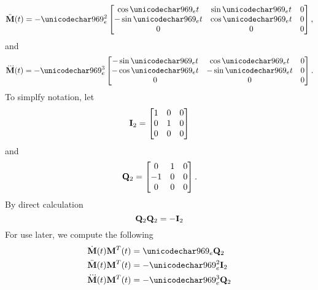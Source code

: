 \begin{equation}
 \ddot{\mtx{M}}(t) = -\omega^2_e\begin{bmatrix}
             \ct & \st & 0\\
             -\st & \ct  & 0\\
             0   & 0    & 0
            \end{bmatrix},
\end{equation}
and
\begin{equation}
 \dddot{\mtx{M}}(t) = -\omega^3_e\begin{bmatrix}
             -\st & \ct & 0\\
             -\ct & -\st  & 0\\
             0   & 0    & 0
            \end{bmatrix}.
\end{equation}
To simplfy notation, let
\begin{equation}
 \Itwo=\begin{bmatrix}
 1 & 0 & 0\\
 0 & 1 & 0\\
 0 & 0 & 0
\end{bmatrix}
\end{equation}
and
\begin{equation}
 \Qtwo=\begin{bmatrix}
 0 & 1 & 0\\
 -1 & 0 & 0\\
 0 & 0 & 0
\end{bmatrix}.
\end{equation}
By direct calculation
\begin{equation}
 \Qtwo\Qtwo = -\Itwo 
\end{equation}
For use later, we compute the following
\begin{align}
\dot{\mtx{M}}(t)\mtx{M}^T(t) &= \omega_e\Qtwo\\
\ddot{\mtx{M}}(t)\mtx{M}^T(t) &= -\omega^2_e\Itwo\\
\dddot{\mtx{M}}(t)\mtx{M}^T(t) &= -\omega^3_e\Qtwo\\
\end{align}
